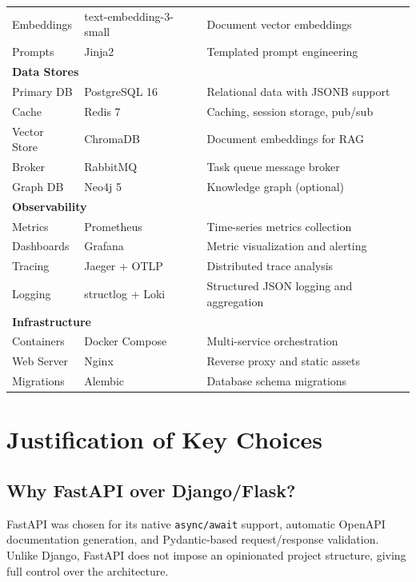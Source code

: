\documentclass[12pt, a4paper]{report}
\begin{document}
\begin{table}[H]
\begin{tabular}{p{2.5cm}|p{3.5cm}|p{7.5cm}}
Embeddings     & text-embedding-3-small & Document vector embeddings \\
Prompts        & Jinja2              & Templated prompt engineering \\
\midrule
\multicolumn{3}{l}{\textbf{Data Stores}} \\
\midrule
Primary DB     & PostgreSQL 16       & Relational data with JSONB support \\
Cache          & Redis 7             & Caching, session storage, pub/sub \\
Vector Store   & ChromaDB            & Document embeddings for RAG \\
Broker         & RabbitMQ            & Task queue message broker \\
Graph DB       & Neo4j 5             & Knowledge graph (optional) \\
\midrule
\multicolumn{3}{l}{\textbf{Observability}} \\
\midrule
Metrics        & Prometheus          & Time-series metrics collection \\
Dashboards     & Grafana             & Metric visualization and alerting \\
Tracing        & Jaeger + OTLP       & Distributed trace analysis \\
Logging        & structlog + Loki    & Structured JSON logging and aggregation \\
\midrule
\multicolumn{3}{l}{\textbf{Infrastructure}} \\
\midrule
Containers     & Docker Compose      & Multi-service orchestration \\
Web Server     & Nginx               & Reverse proxy and static assets \\
Migrations     & Alembic             & Database schema migrations \\
\bottomrule
\end{tabular}
\end{table}

\section{Justification of Key Choices}

\subsection{Why FastAPI over Django/Flask?}
FastAPI was chosen for its native \texttt{async/await} support, automatic OpenAPI documentation generation, and Pydantic-based request/response validation. Unlike Django, FastAPI does not impose an opinionated project structure, giving full control over the architecture.
\end{document}
